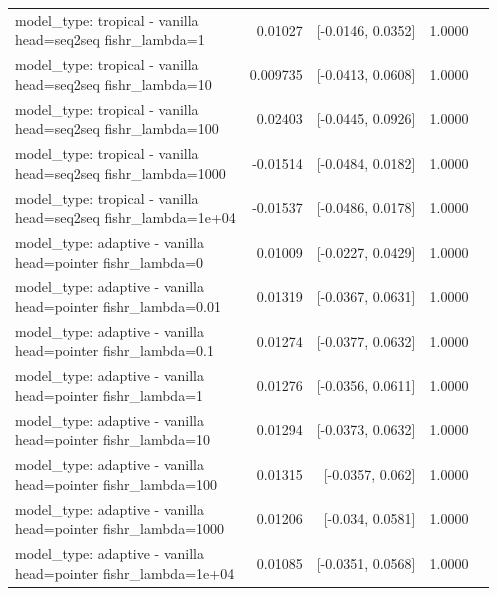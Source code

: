 \documentclass[10pt]{article}
\makeatletter
\newcommand{\stackcell}[1]{\begin{tabular}[t]{@{}l@{}}#1\end{tabular}}
\makeatother
\begin{document}
{\begin{longtable}{lrrrl}
\stackcell{model\_type: tropical - vanilla\\\footnotesize head=seq2seq fishr\_lambda=1 } & 0.01027 & [-0.0146, 0.0352] & 1.0000 & \\
\stackcell{model\_type: tropical - vanilla\\\footnotesize head=seq2seq fishr\_lambda=10 } & 0.009735 & [-0.0413, 0.0608] & 1.0000 & \\
\stackcell{model\_type: tropical - vanilla\\\footnotesize head=seq2seq fishr\_lambda=100 } & 0.02403 & [-0.0445, 0.0926] & 1.0000 & \\
\stackcell{model\_type: tropical - vanilla\\\footnotesize head=seq2seq fishr\_lambda=1000 } & -0.01514 & [-0.0484, 0.0182] & 1.0000 & \\
\stackcell{model\_type: tropical - vanilla\\\footnotesize head=seq2seq fishr\_lambda=1e+04 } & -0.01537 & [-0.0486, 0.0178] & 1.0000 & \\
\stackcell{model\_type: adaptive - vanilla\\\footnotesize head=pointer fishr\_lambda=0 } & 0.01009 & [-0.0227, 0.0429] & 1.0000 & \\
\stackcell{model\_type: adaptive - vanilla\\\footnotesize head=pointer fishr\_lambda=0.01 } & 0.01319 & [-0.0367, 0.0631] & 1.0000 & \\
\stackcell{model\_type: adaptive - vanilla\\\footnotesize head=pointer fishr\_lambda=0.1 } & 0.01274 & [-0.0377, 0.0632] & 1.0000 & \\
\stackcell{model\_type: adaptive - vanilla\\\footnotesize head=pointer fishr\_lambda=1 } & 0.01276 & [-0.0356, 0.0611] & 1.0000 & \\
\stackcell{model\_type: adaptive - vanilla\\\footnotesize head=pointer fishr\_lambda=10 } & 0.01294 & [-0.0373, 0.0632] & 1.0000 & \\
\stackcell{model\_type: adaptive - vanilla\\\footnotesize head=pointer fishr\_lambda=100 } & 0.01315 & [-0.0357, 0.062] & 1.0000 & \\
\stackcell{model\_type: adaptive - vanilla\\\footnotesize head=pointer fishr\_lambda=1000 } & 0.01206 & [-0.034, 0.0581] & 1.0000 & \\
\stackcell{model\_type: adaptive - vanilla\\\footnotesize head=pointer fishr\_lambda=1e+04 } & 0.01085 & [-0.0351, 0.0568] & 1.0000 & \\

\end{longtable}}
\end{document}
